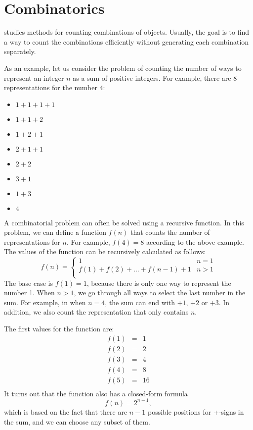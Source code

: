 \chapter{Combinatorics}


 studies methods for counting
combinations of objects.
Usually, the goal is to find a way to
count the combinations efficiently
without generating each combination separately.

As an example, let us consider the problem
of counting the number of ways to
represent an integer $n$ as a sum of positive integers.
For example, there are 8 representations
for the number $4$:
\begin{multicols}{2}
\begin{itemize}
\item $1+1+1+1$
\item $1+1+2$
\item $1+2+1$
\item $2+1+1$
\item $2+2$
\item $3+1$
\item $1+3$
\item $4$
\end{itemize}
\end{multicols}

A combinatorial problem can often be solved
using a recursive function.
In this problem, we can define a function $f(n)$
that counts the number of representations for $n$.
For example, $f(4)=8$ according to the above example.
The values of the function
can be recursively calculated as follows:
\begin{equation*}
    f(n) = \begin{cases}
               1               & n = 1\\
               f(1)+f(2)+\ldots+f(n-1)+1 & n > 1\\
           \end{cases}
\end{equation*}
The base case is $f(1)=1$,
because there is only one way to represent the number 1.
When $n>1$, we go through all ways to
select the last number in the sum.
For example, in when $n=4$, the sum can end
with $+1$, $+2$ or $+3$.
In addition, we also count the representation
that only contains $n$.

The first values for the function are:
\[
\begin{array}{lcl}
f(1) & = & 1 \\
f(2) & = & 2 \\
f(3) & = & 4 \\
f(4) & = & 8 \\
f(5) & = & 16 \\
\end{array}
\]
It turns out that the function also has a closed-form formula
\[
f(n)=2^{n-1},
\]
which is based on the fact that there are $n-1$
possible positions for +-signs in the sum,
and we can choose any subset of them.

